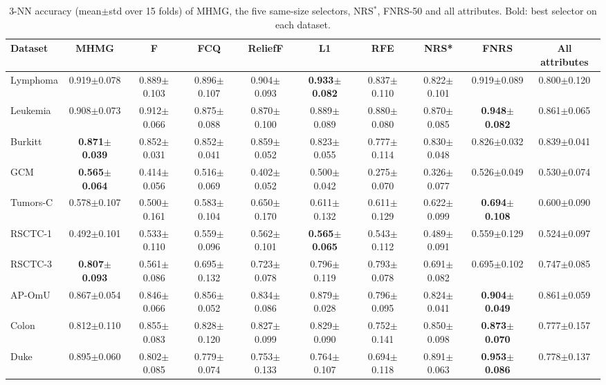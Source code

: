 \begin{table}[!t]
\centering
\caption{3-NN accuracy (mean$\pm$std over 15 folds) of MHMG, the five same-size selectors, NRS$^*$, FNRS-50 and all attributes. Bold: best selector on each dataset.}
\label{tab:acc_knn}
\scriptsize
\setlength{\tabcolsep}{3pt}
\begin{tabular*}{\textwidth}{@{\extracolsep{\fill}}lccccccccc@{}}
\toprule
Dataset & MHMG & F & FCQ & ReliefF & L1 & RFE & NRS* & FNRS & All attributes \\
\midrule
Lymphoma & 0.919$\pm$0.078 & 0.889$\pm$0.103 & 0.896$\pm$0.107 & 0.904$\pm$0.093 & \textbf{0.933$\pm$0.082} & 0.837$\pm$0.110 & 0.822$\pm$0.101 & 0.919$\pm$0.089 & 0.800$\pm$0.120 \\
Leukemia & 0.908$\pm$0.073 & 0.912$\pm$0.066 & 0.875$\pm$0.088 & 0.870$\pm$0.100 & 0.889$\pm$0.089 & 0.880$\pm$0.080 & 0.870$\pm$0.085 & \textbf{0.948$\pm$0.082} & 0.861$\pm$0.065 \\
Burkitt & \textbf{0.871$\pm$0.039} & 0.852$\pm$0.031 & 0.852$\pm$0.041 & 0.859$\pm$0.052 & 0.823$\pm$0.055 & 0.777$\pm$0.114 & 0.830$\pm$0.048 & 0.826$\pm$0.032 & 0.839$\pm$0.041 \\
GCM & \textbf{0.565$\pm$0.064} & 0.414$\pm$0.056 & 0.516$\pm$0.069 & 0.402$\pm$0.052 & 0.500$\pm$0.042 & 0.275$\pm$0.070 & 0.326$\pm$0.077 & 0.526$\pm$0.049 & 0.530$\pm$0.074 \\
Tumors-C & 0.578$\pm$0.107 & 0.500$\pm$0.161 & 0.583$\pm$0.104 & 0.650$\pm$0.170 & 0.611$\pm$0.132 & 0.611$\pm$0.129 & 0.622$\pm$0.099 & \textbf{0.694$\pm$0.108} & 0.600$\pm$0.090 \\
RSCTC-1 & 0.492$\pm$0.101 & 0.533$\pm$0.110 & 0.559$\pm$0.096 & 0.562$\pm$0.101 & \textbf{0.565$\pm$0.065} & 0.543$\pm$0.112 & 0.489$\pm$0.091 & 0.559$\pm$0.129 & 0.524$\pm$0.097 \\
RSCTC-3 & \textbf{0.807$\pm$0.093} & 0.561$\pm$0.086 & 0.695$\pm$0.132 & 0.723$\pm$0.078 & 0.796$\pm$0.119 & 0.793$\pm$0.078 & 0.691$\pm$0.082 & 0.695$\pm$0.102 & 0.747$\pm$0.085 \\
AP-OmU & 0.867$\pm$0.054 & 0.846$\pm$0.066 & 0.856$\pm$0.052 & 0.834$\pm$0.086 & 0.879$\pm$0.028 & 0.796$\pm$0.095 & 0.824$\pm$0.041 & \textbf{0.904$\pm$0.049} & 0.861$\pm$0.059 \\
Colon & 0.812$\pm$0.110 & 0.855$\pm$0.083 & 0.828$\pm$0.120 & 0.827$\pm$0.099 & 0.829$\pm$0.090 & 0.752$\pm$0.141 & 0.850$\pm$0.098 & \textbf{0.873$\pm$0.070} & 0.777$\pm$0.157 \\
Duke & 0.895$\pm$0.060 & 0.802$\pm$0.085 & 0.779$\pm$0.074 & 0.753$\pm$0.133 & 0.764$\pm$0.107 & 0.694$\pm$0.118 & 0.891$\pm$0.063 & \textbf{0.953$\pm$0.086} & 0.778$\pm$0.137 \\

\end{tabular*}
\end{table}
